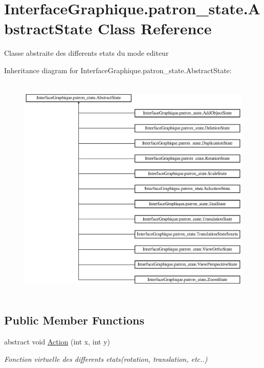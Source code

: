 \hypertarget{class_interface_graphique_1_1patron__state_1_1_abstract_state}{\section{Interface\-Graphique.\-patron\-\_\-state.\-Abstract\-State Class Reference}
\label{class_interface_graphique_1_1patron__state_1_1_abstract_state}
}


Classe abstraite des differents etats du mode editeur  


Inheritance diagram for Interface\-Graphique.\-patron\-\_\-state.\-Abstract\-State\-:\begin{figure}[H]
\begin{center}
\leavevmode
\includegraphics[height=10.996979cm]{class_interface_graphique_1_1patron__state_1_1_abstract_state}
\end{center}
\end{figure}
\subsection*{Public Member Functions}
\begin{DoxyCompactItemize}
\item 
abstract void \hyperlink{class_interface_graphique_1_1patron__state_1_1_abstract_state_a8df97c5a2784f9757608d669fbb1c6b5}{Action} (int x, int y)
\begin{DoxyCompactList}\small\item\em Fonction virtuelle des differents etats(rotation, translation, etc..) \end{DoxyCompactList}\end{DoxyCompactItemize}



